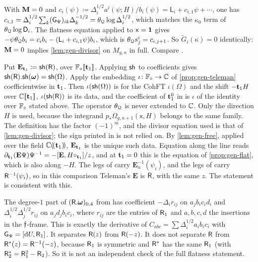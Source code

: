 \begin{rmk}
\label{rmk:gen-kappa}
With $\mathbf{M}=0$ and $c_i(\psi)\coloneqq\Delta_i^{1/2}a^i(\psi;H)/b_i(\psi)=\mathsf{L}_i+c_{i,1}\psi+\cdots$, one has $c_{i,1}=\Delta_i^{1/2}\sum_k(\mathsf{G}_{\Psi})_{ik}\Delta_k^{-1/2}=\theta_{\mathcal{Q}}\log\Delta_i^{1/2}$, which matches the $\kappa_0$ term of $\theta_{\mathcal{Q}}\log\mathsf{D}_i$. The flatness equation applied to $\mathsf{x}=\mathbf{1}$ gives $-\psi\theta_{\mathcal{Q}} b_i=c_ib_i-(\mathsf{L}_i+c_{i,1}\psi)b_i$, which is $\theta_{\mathcal{Q}} s^i_j=c_{i,j+1}$. So $\widetilde{G}_i(\kappa)=0$ identically: $\mathbf{M}=0$ implies \cref{lem:gen-divisor} on $M_{g,n}$ in full. Compare \cite[(7.7.c)]{Tel12}. 
\end{rmk}

\begin{rmk}
\label{rmk:gen-teleman77}
Put $\mathbf{E}_{\mathbf{t}_1}\coloneqq\mathsf{sh}(\mathsf{R})$, over $\mathbb{F}_{\circ}[\![ \mathbf{t}_1 ]\!]$. Applying $\mathsf{sh}$ to coefficients gives $\mathsf{sh}(\mathsf{R}).\mathsf{sh}(\boldsymbol{\omega})=\mathsf{sh}(\Omega)$. Apply the embedding $\iota\colon\mathbb{F}_{\circ}\to\mathbb{C}$ of \cref{prop:gen-teleman} coefficientwise in $\mathbf{t}_1$. Then $\iota(\mathsf{sh}(\Omega))$ is \cite[Def.~7.1]{Tel12} for the CohFT $\iota(\Omega)$ and the shift $-\mathbf{t}_1H$ over $\mathbb{C}[\![ \mathbf{t}_1 ]\!]$, $\iota(\mathsf{sh}(\mathsf{R}))$ is its data, and the coefficient of $\mathbf{t}_1^0$ in \cite[(7.7.a)]{Tel12} is $\iota$ of the identity over $\mathbb{F}_{\circ}$ stated above. The operator $\theta_{\mathcal{Q}}$ is never extended to $\mathbb{C}$. Only the direction $H$ is used, because the integrand $p_*\Omega_{g,n+1}(\mathsf{x},H)$ belongs to the same family. The definition \cite[Def.~7.1]{Tel12} has the factor $(-1)^m$, and the divisor equation used is that of \cref{lem:gen-divisor}; the sign printed in \cite[Ex.~7.17]{Tel12} is not relied on. By \cref{lem:gen-free}, applied over the field $\mathbb{C}(\!(\mathbf{t}_1)\!)$, $\mathbf{E}_{\mathbf{t}_1}$ is the unique such data. Equation \cite[(7.7.a)]{Tel12} along the line reads $\partial_{\mathbf{t}_1}(\mathbf{E}\Psi)\Psi^{-1}=-[\mathbf{E},H\circ_{\mathbf{t}_1}]/z$, and at $\mathbf{t}_1=0$ this is the equation of \cref{prop:gen-flat}, which is also \cite[(7.7.a)]{Tel12} along $-H$. The legs of \cite[(7.6)]{Tel12} carry $\mathbf{E}_u^{-1}(\psi_i)$, and the legs of \cite[Def.~2.2]{PPZ15} carry $\mathsf{R}^{-1}(\psi_i)$, so in this comparison Teleman's $\mathbf{E}$ is $\mathsf{R}$, with the same $z$. The statement \cite[Prop.~8.2(ii)]{Tel12} is consistent with this.
\end{rmk}

\begin{rmk}
\label{rmk:gen-sign}
The degree-$1$ part of $(\mathsf{R}.\boldsymbol{\omega})_{0,4}$ from \cite[Def.~2.2]{PPZ15} has coefficient $-\Delta_ir_{ij}$ on $a_jb_ic_id_i$ and $\Delta_i^{1/2}\Delta_j^{1/2}r_{ij}$ on $a_jd_jb_ic_i$, where $r_{ij}$ are the entries of $\mathsf{R}_1$ and $a,b,c,d$ the insertions in the $\mathfrak{f}$-frame. This is exactly the derivative of $C_{abc}=\sum\Delta_i^{1/2}a_ib_ic_i$ with $\mathsf{G}_{\Psi}=[\mathrm{d} U,\mathsf{R}_1]$. It separates $\mathsf{R}(z)$ from $\mathsf{R}(-z)$. It does not separate $\mathsf{R}$ from $\mathsf{R}^*(z)=\mathsf{R}^{-1}(-z)$, because $\mathsf{R}_1$ is symmetric and $\mathsf{R}^*$ has the same $\mathsf{R}_1$ (with $\mathsf{R}^*_2=\mathsf{R}_1^2-\mathsf{R}_2$). So it is not an independent check of the full flatness statement.
\end{rmk}

